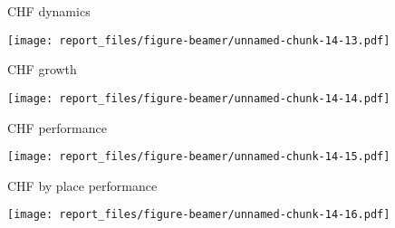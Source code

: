 \documentclass[ignorenonframetext,]{beamer}
\begin{document}
\begin{frame}{CHF dynamics}
\protect\hypertarget{chf-dynamics}{}

\texttt{[image: report\_files/figure-beamer/unnamed-chunk-14-13.pdf]}

\end{frame}

\begin{frame}{CHF growth}
\protect\hypertarget{chf-growth}{}

\texttt{[image: report\_files/figure-beamer/unnamed-chunk-14-14.pdf]}

\end{frame}

\begin{frame}{CHF performance}
\protect\hypertarget{chf-performance}{}

\texttt{[image: report\_files/figure-beamer/unnamed-chunk-14-15.pdf]}

\end{frame}

\begin{frame}{CHF by place performance}
\protect\hypertarget{chf-by-place-performance}{}

\texttt{[image: report\_files/figure-beamer/unnamed-chunk-14-16.pdf]}

\end{frame}
\end{document}

